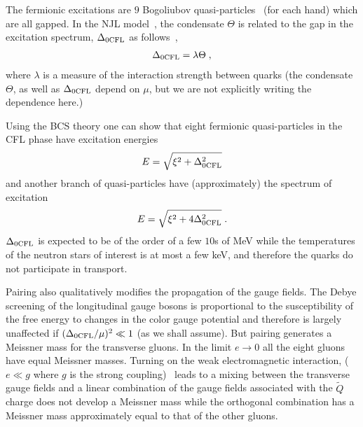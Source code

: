\documentclass[10pt, aps, prd, superscriptaddress, nofootinbib, 
               amsmath, amssymb, twocolumn,
               preprintnumbers, showpacs,
               raggedbottom,
               floatfix]{revtex4-1}
\begin{document}
The fermionic excitations are $9$ Bogoliubov quasi-particles~\cite{Alford:1998mk} (for each
hand) which are all gapped. In the NJL model~\cite{nambu1961dynamical}, the condensate
$\Theta$ is related to the gap in the excitation spectrum,
$\Delta_{0{\rm{CFL}}}$ as follows~\cite{Alford:1998mk},
\begin{equation}
\begin{split}
\Delta_{0{\rm{CFL}}} = \lambda \Theta\;,
\end{split}
\end{equation}
where $\lambda$ is a measure of the interaction strength between quarks (the
condensate $\Theta$, as well as $\Delta_{0{\rm{CFL}}}$ depend on $\mu$, but we
are not explicitly writing the dependence here.) 

Using the BCS theory one can show that eight fermionic quasi-particles in
the CFL phase have excitation energies~\cite{Alford:1999pa,Alford:1999xc,Casalbuoni:2000na}
\begin{equation}
E=\sqrt{\xi^2+\Delta_{0{\rm{CFL}}}^2}
\end{equation}
and another branch of quasi-particles have (approximately) the spectrum of
excitation
\begin{equation}
E=\sqrt{\xi^2+4\Delta_{0{\rm{CFL}}}^2}\;.
\end{equation}
$\Delta_{0{\rm{CFL}}}$ is expected to be of the order of a few $10$s 
of MeV while the temperatures of the neutron stars of interest is at most a few
keV, and therefore the quarks do not participate in transport. 

Pairing also qualitatively modifies the propagation of the gauge fields. The
Debye screening of the longitudinal gauge bosons is proportional to the
susceptibility of the free energy to changes in the color gauge potential and
therefore is largely unaffected if $(\Delta_{0{\rm{CFL}}}/\mu)^2\ll1$ (as we
shall assume). But pairing generates a Meissner mass for the transverse gluons.
In the limit $e\rightarrow 0$ all the eight gluons have equal Meissner
masses. Turning on the weak electromagnetic interaction, ($e\ll g$ where $g$ is
the strong coupling)~\cite{Alford:1998mk,Rischke:2000ra,Casalbuoni:2000na}
leads to a mixing between the transverse gauge fields and a linear combination
of the gauge fields associated with the $\tilde{Q}$ charge does not develop a
Meissner mass while the orthogonal combination has a Meissner mass
approximately equal to that of the other gluons.
\end{document}
